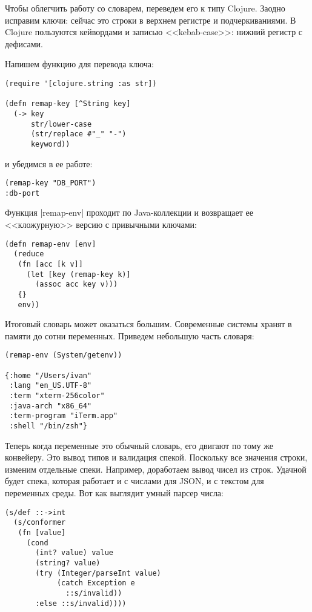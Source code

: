 Чтобы облегчить работу со словарем, переведем его к типу Clojure. Заодно
исправим ключи: сейчас это строки в верхнем регистре и подчеркиваниями. В
Clojure пользуются кейвордами и записью <<kebab-case>>: нижний регистр с
дефисами.

Напишем функцию для перевода ключа:

\begin{verbatim}
(require '[clojure.string :as str])

(defn remap-key [^String key]
  (-> key
      str/lower-case
      (str/replace #"_" "-")
      keyword))
\end{verbatim}

\noindent
и убедимся в ее работе:

\begin{verbatim}
(remap-key "DB_PORT")
:db-port
\end{verbatim}

Функция \spverb|remap-env| проходит по Java-коллекции и возвращает ее
<<кложурную>> версию с привычными ключами:

\begin{verbatim}
(defn remap-env [env]
  (reduce
   (fn [acc [k v]]
     (let [key (remap-key k)]
       (assoc acc key v)))
   {}
   env))
\end{verbatim}

Итоговый словарь может оказаться большим. Современные системы хранят в памяти до
сотни переменных. Приведем небольшую часть словаря:

\begin{verbatim}
(remap-env (System/getenv))

{:home "/Users/ivan"
 :lang "en_US.UTF-8"
 :term "xterm-256color"
 :java-arch "x86_64"
 :term-program "iTerm.app"
 :shell "/bin/zsh"}
\end{verbatim}

Теперь когда переменные это обычный словарь, его двигают по тому же
конвейеру. Это вывод типов и валидация спекой. Поскольку все значения строки,
изменим отдельные спеки. Например, доработаем вывод чисел из строк. Удачной
будет спека, которая работает и с числами для JSON, и с текстом для переменных
среды. Вот как выглядит умный парсер числа:

\begin{verbatim}
(s/def ::->int
  (s/conformer
   (fn [value]
     (cond
       (int? value) value
       (string? value)
       (try (Integer/parseInt value)
            (catch Exception e
              ::s/invalid))
       :else ::s/invalid))))
\end{verbatim}

